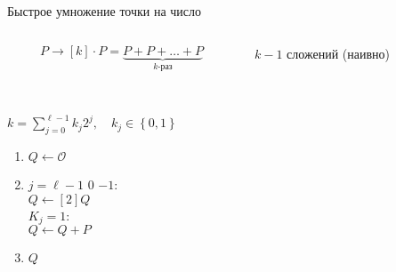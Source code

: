 \documentclass{beamer}
\begin{document}
\begin{frame}{Быстрое умножение точки на число}
    \begin{columns}
        \begin{column}{0.5\textwidth}
          \[
          P \to \left[ k \right] \cdot P = \underbrace {P + P +  \ldots  + P}_{k{\text{-раз}}}
          \]
        \end{column}
        \begin{column}{0.5\textwidth}
            \begin{center}
                \begin{tcolorbox}[enhanced,hbox,colback=box-blue-color!15,colframe=box-blue-color,title=Сложность,center title]
                    \begin{varwidth}{\textwidth}
                        \begin{center}
                            $k-1$ сложений (наивно)
                        \end{center}
                    \end{varwidth}
                \end{tcolorbox}	
            \end{center}
        \end{column}
    \end{columns}
%
    \begin{columns}
        \begin{column}{0.5\textwidth}
            \\
            $k = \sum\limits_{j = 0}^{\ell - 1} {{k_j}{2^j}} ,\quad {k_j} \in \left\{ {0,1} \right\}$\\
            \begin{enumerate}
                \item $Q \leftarrow \mathcal{O}$
                \item {} $j = \ell - 1$  $0$  $-1$:\\
                \quad$Q \leftarrow \left[ 2 \right]Q$ \\
                 ${K_j} = 1$:\\
                \quad$Q \leftarrow Q + P$
                \item {} $Q$
            \end{enumerate}
        \end{column}
        \begin{column}{0.5\textwidth}
            \begin{center}

\end{center}
\end{column}
\end{columns}
\end{frame}
\end{document}
